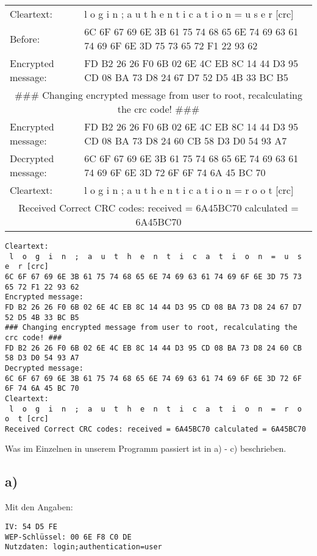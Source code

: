 \documentclass[10pt,a4paper]{article}
\begin{document}
\begin{small}
\begin{tabular}{ll}
Cleartext: & l  o  g  i  n  ;  a  u  t  h  e  n  t  i  c  a  t  i  o  n  =  u  s  e  r [crc]\\
Before: & 6C 6F 67 69 6E 3B 61 75 74 68 65 6E 74 69 63 61 74 69 6F 6E 3D 75 73 65 72 F1 22 93 62 \\
Encrypted message: & FD B2 26 26 F0 6B 02 6E 4C EB 8C 14 44 D3 95 CD 08 BA 73 D8 24 67 D7 52 D5 4B 33 BC B5 \\
\multicolumn{2}{c}{\#\#\# Changing encrypted message from user to root, recalculating the crc code! \#\#\#}\\
Encrypted message: & FD B2 26 26 F0 6B 02 6E 4C EB 8C 14 44 D3 95 CD 08 BA 73 D8 24 60 CB 58 D3 D0 54 93 A7 \\
Decrypted message: & 6C 6F 67 69 6E 3B 61 75 74 68 65 6E 74 69 63 61 74 69 6F 6E 3D 72 6F 6F 74 6A 45 BC 70 \\
Cleartext: & l  o  g  i  n  ;  a  u  t  h  e  n  t  i  c  a  t  i  o  n  =  r  o  o  t [crc]\\
\multicolumn{2}{c}{Received Correct CRC codes: received = 6A45BC70 calculated = 6A45BC70}
\end{tabular}
\begin{verbatim}
Cleartext:
 l  o  g  i  n  ;  a  u  t  h  e  n  t  i  c  a  t  i  o  n  =  u  s  e  r [crc]
6C 6F 67 69 6E 3B 61 75 74 68 65 6E 74 69 63 61 74 69 6F 6E 3D 75 73 65 72 F1 22 93 62 
Encrypted message:
FD B2 26 26 F0 6B 02 6E 4C EB 8C 14 44 D3 95 CD 08 BA 73 D8 24 67 D7 52 D5 4B 33 BC B5 
### Changing encrypted message from user to root, recalculating the crc code! ###
FD B2 26 26 F0 6B 02 6E 4C EB 8C 14 44 D3 95 CD 08 BA 73 D8 24 60 CB 58 D3 D0 54 93 A7 
Decrypted message:
6C 6F 67 69 6E 3B 61 75 74 68 65 6E 74 69 63 61 74 69 6F 6E 3D 72 6F 6F 74 6A 45 BC 70 
Cleartext:
 l  o  g  i  n  ;  a  u  t  h  e  n  t  i  c  a  t  i  o  n  =  r  o  o  t [crc]
Received Correct CRC codes: received = 6A45BC70 calculated = 6A45BC70
\end{verbatim}
\end{small}

Was im Einzelnen in unserem Programm passiert ist in a) - c) beschrieben.

\subsection*{a)}

Mit den Angaben:

\begin{verbatim}
IV: 54 D5 FE
WEP-Schlüssel: 00 6E F8 C0 DE
Nutzdaten: login;authentication=user
\end{verbatim}
\end{document}
